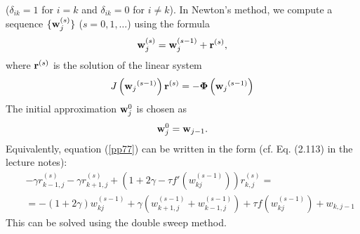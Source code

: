 \documentclass[10pt]{article}
\def\bw{{\bf w}}
\begin{document}
($\delta_{ik}=1$ for $i=k$ and $\delta_{ik}=0$ for $i\neq k$). In Newton's method,
we compute a sequence $\{\bw_j^{(s)}\}$ ($s=0,1,\dots$) using the formula
\begin{equation}
\bw_j^{(s)}=\bw_j^{(s-1)}+{\bf r}^{(s)},\label{pp66}
\end{equation}
where ${\bf r}^{(s)}$ is the solution of the linear system
\begin{equation}
J\left({\bw_j}^{(s-1)}\right){\bf r}^{(s)}=-{\boldsymbol{\Phi}}\left({\bw_j}^{(s-1)}\right) \label{pp77}
\end{equation}
The initial approximation $\bw_j^{0}$ is chosen as
\[
\bw_j^{0}=\bw_{j-1}.
\]
Equivalently, equation (\ref{pp77}) can be written
 in the form (cf. Eq. (2.113) in the lecture notes):
\begin{eqnarray}
&&-\gamma r_{k-1,j}^{(s)}
-\gamma r_{k+1,j}^{(s)}+\left(1+2\gamma - \tau f'\left(w_{kj}^{(s-1)}\right)\right)r_{k,j}^{(s)}=  \nonumber \\
&&=-(1+2\gamma)w_{kj}^{(s-1)}+\gamma\left(w_{k+1,j}^{(s-1)}+w_{k-1,j}^{(s-1)}\right)+\tau f\left(w_{kj}^{(s-1)}\right)+w_{k,j-1}  \label{pp88}
\end{eqnarray}
This can be solved using the double sweep method.
\end{document}
